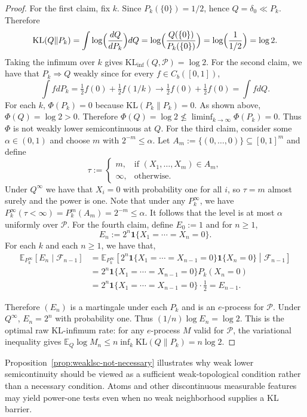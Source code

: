 \documentclass[11pt]{article}
\newcommand{\KL}{\mathrm{KL}}
\newcommand{\KLinf}{\mathrm{KL}_{\mathrm{inf}}}
\newcommand{\E}{\mathbb{E}}
\newcommand{\Pcal}{\mathcal{P}}
\newcommand{\one}{\mathbf{1}}
\theoremstyle{definition}
\theoremstyle{definition}
\begin{document}
\begin{proof}
For the first claim, fix $k$. Since $P_k(\{0\})=1/2$, hence $Q=\delta_0\ll P_k$. Therefore
\[
\KL(Q\|P_k)=\int\log\Bigl(\frac{dQ}{dP_k}\Bigr)dQ =\log\Bigl(\frac{Q(\{0\})}{P_k(\{0\})}\Bigr) =\log\Bigl(\frac{1}{1/2}\Bigr)=\log 2.
\]
Taking the infimum over $k$ gives $\KLinf(Q,\Pcal)=\log 2$. For the second claim, we have that $P_k\Rightarrow Q$ weakly since for every $f\in C_b([0,1])$,
\[
\int fdP_k=\tfrac12 f(0)+\tfrac12 f(1/k)\to \tfrac12 f(0)+\tfrac12 f(0)=\int fdQ.
\]
For each $k$, $\Phi(P_k)=0$ because $\KL(P_k\|P_k)=0$. As shown above, $\Phi(Q)=\log 2>0$. Therefore $\Phi(Q)=\log 2\not\le \liminf_{k\to\infty}\Phi(P_k)=0$. Thus $\Phi$ is not weakly lower semicontinuous at $Q$. For the third claim, consider some $\alpha\in(0,1)$ and choose $m$ with $2^{-m}\le\alpha$. Let $A_m:=\{(0,\ldots,0)\}\subseteq[0,1]^m$ and define
\[
\tau:=
\begin{cases}m,&\text{if }(X_1,\dots,X_m)\in A_m,\\
\infty,&\text{otherwise.}
\end{cases}
\]
Under $Q^\infty$ we have that $X_i=0$ with probability one for all $i$, so $\tau=m$ almost surely and the power is one. Note that under any $P_k^\infty$, we have $P_k^\infty(\tau<\infty)=P_k^m(A_m)=2^{-m}\le \alpha$. It follows that the level is at most $\alpha$ uniformly over $\Pcal$. For the fourth claim, define $E_0:=1$ and for $n\ge 1$,
\[
E_n:=2^n\one\{X_1=\cdots=X_n=0\}.
\]
For each $k$ and each $n\ge 1$, we have that,
\begin{align*}
\E_{P_k^\infty}[E_n\mid\mathcal F_{n-1}]&=\E_{P_k^\infty}\left[2^n\one\{X_1=\cdots=X_{n-1}=0\}\one\{X_n=0\}\middle|\mathcal F_{n-1}\right]\\
&=2^n\one\{X_1=\cdots=X_{n-1}=0\}P_k(X_n=0)\\
&=2^n\one\{X_1=\cdots=X_{n-1}=0\}\cdot\tfrac12=E_{n-1}.
\end{align*}

\noindent Therefore $(E_n)$ is a martingale under each $P_k$ and is an $e$-process for $\Pcal$. Under $Q^\infty$, $E_n=2^n$ with probability one. Thus $(1/n)\log E_n=\log 2$. This is the optimal raw KL-infimum rate: for any $e$-process $M$ valid for $\Pcal$, the variational inequality gives $\E_Q\log M_n\le n\inf_k\KL(Q\|P_k)=n\log2$.
\end{proof}

\noindent Proposition~\ref{prop:weaklsc-not-necessary} illustrates why weak lower semicontinuity should be viewed as a sufficient weak-topological condition rather than a necessary condition.  Atoms and other discontinuous measurable features may yield power-one tests even when no weak neighborhood supplies a KL barrier.
\end{document}
